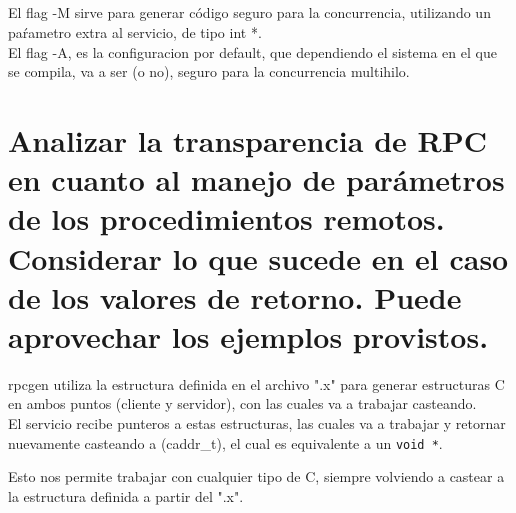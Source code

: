 \documentclass[osajnl,twocolumn,showpacs,superscriptaddress,10pt]{revtex4-1} %
\begin{document}
\subsection{}
El flag -M sirve para generar código seguro para la concurrencia, utilizando un paŕametro extra al servicio, de tipo int *. \\
El flag -A, es la configuracion por default, que dependiendo el sistema en el que se compila, va a ser (o no), seguro para la concurrencia multihilo.

\section{Analizar la transparencia de RPC en cuanto al manejo de parámetros de los procedimientos
remotos. Considerar lo que sucede en el caso de los valores de retorno. Puede aprovechar los
ejemplos provistos.}

rpcgen utiliza la estructura definida en el archivo ".x" para generar estructuras C en ambos puntos (cliente y servidor), con las cuales va a trabajar casteando. \\

El servicio recibe punteros a estas estructuras, las cuales va a trabajar y retornar nuevamente casteando a (caddr\_t), el cual es equivalente a un \texttt{void *}.

Esto nos permite trabajar con cualquier tipo de C, siempre volviendo a castear a la estructura definida a partir del ".x".
\end{document}
